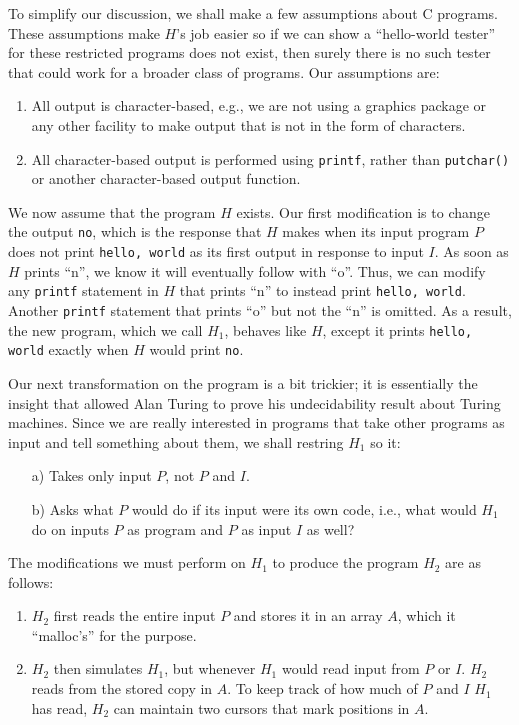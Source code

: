 \documentclass[]{article}
\begin{document}
To simplify our discussion, we shall make a few assumptions about C
programs. These assumptions make $H$'s job easier so if we can show a
``hello-world tester'' for these restricted programs does not exist, then
surely there is no such tester that could work for a broader class of
programs. Our assumptions are:
\begin{enumerate}
\item All output is character-based, e.g., we are not using a graphics
package or any other facility to make output that is not in the form of
characters.
\item All character-based output is performed using \texttt{printf},
rather than \texttt{putchar()} or another character-based output
function.
\end{enumerate}

We now assume that the program $H$ exists. Our first modification is to
change the output \texttt{no}, which is the response that $H$ makes when
its input program $P$ does not print \texttt{hello, world} as its first
output in response to input $I$. As soon as $H$ prints ``n'', we know it
will eventually follow with ``o''. Thus, we can modify any \texttt{printf}
statement in $H$ that prints ``n'' to instead print \texttt{hello, world}.
Another \texttt{printf} statement that prints ``o'' but not the ``n'' is
omitted. As a result, the new program, which we call $H_1$, behaves like
$H$, except it prints \texttt{hello, world} exactly when $H$ would print
\texttt{no}.

Our next transformation on the program is a bit trickier; it is essentially
the insight that allowed Alan Turing to prove his undecidability result
about Turing machines. Since we are really interested in programs that take
other programs as input and tell something about them, we shall restring
$H_1$ so it:
\begin{enumerate}
\item[a)] Takes only input $P$, not $P$ and $I$.
\item[b)] Asks what $P$ would do if its input were its own code, i.e.,
what would $H_1$ do on inputs $P$ as program and $P$ as input $I$ as
well?
\end{enumerate}

The modifications we must perform on $H_1$ to produce the program $H_2$ are
as follows:
\begin{enumerate}
\item $H_2$ first reads the entire input $P$ and stores it in an array
$A$, which it ``malloc's'' for the purpose.
\item $H_2$ then simulates $H_1$, but whenever $H_1$ would read input
from $P$ or $I$. $H_2$ reads from the stored copy in $A$. To keep track
of how much of $P$ and $I$ $H_1$ has read, $H_2$ can maintain two
cursors that mark positions in $A$.
\end{enumerate}
\end{document}
